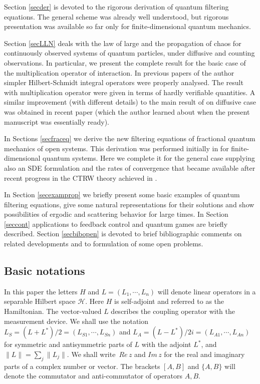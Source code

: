 \documentclass[12pt]{article}
\def\HC{\mathcal{H}}
\begin{document}
Section \ref{secder} is devoted to the rigorous derivation of quantum filtering equations.
The general scheme was already well understood, but rigorous presentation was available
so far only for finite-dimensional quantum mechanics.

Section \ref{secLLN} deals with
the law of large and the propagation of chaos for continuously observed systems of quantum
particles, under diffusive and counting observations.
In particular, we present the complete result for the
basic case of the multiplication operator of interaction.
In previous papers of the author  simpler Hilbert-Schmidt
integral operators were properly analysed. The result with multiplication operator were
given in terms of hardly verifiable quantities. A similar improvement
(with different details) to the main result of \cite{KolQuantMFG} on diffusive case
was obtained in recent paper \cite{Bouard} (which the author learned about when the
present manuscript was essentially ready).

In Sections \ref{secfraceq} we derive the new filtering
equations of fractional quantum mechanics of open systems. This derivation was performed
initially in \cite{KolQuantFrac} for finite-dimensional quantum systems. Here we complete
it for the general case supplying also an SDE formulation and the rates of convergence that became available after
recent progress in the CTRW theory achieved in \cite{KolRates}.

In Section \ref{secexamprop} we briefly present some basic examples of quantum filtering equations,
give some natural representations for their solutions and show possibilities of ergodic and scattering
behavior for large times. In Section \ref{seccont} applications to feedback control and quantum games
are briefly described. Section \ref{secbibopen} is devoted to brief bibliographic comments on related
developments and to formulation of some open problems.


  \subsection{Basic notations}

In this paper the letters $H$ and $L=(L_1, \cdots, L_n)$ will denote linear operators
in a separable Hilbert space $\HC$. Here $H$ is self-adjoint and referred to as
the Hamiltonian. The vector-valued $L$ describes
the coupling operator with the measurement device. We shall use the notation
$L_S=(L+L^*)/2=(L_{S1}, \cdots, L_{Sn})$ and $L_A=(L-L^*)/2i=(L_{A1}, \cdots, L_{An})$
for symmetric and antisymmetric parts of $L$ with the adjoint $L^*$, and $\|L\|=\sum_j \|L_j\|$.
We shall write $\, Re \, z$ and $Im \, z$ for the real and imaginary parts of a complex number
or vector. The brackets $[A,B]$ and $\{A,B\}$
will denote the commutator and anti-commutator of operators $A,B$.
\end{document}
